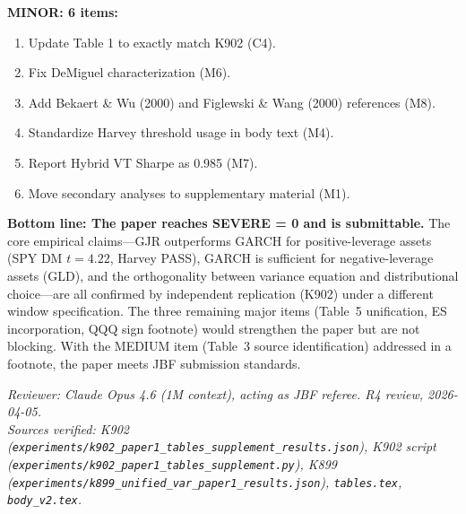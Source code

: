 \documentclass[12pt,a4paper]{article}
\begin{document}
\textbf{MINOR: 6 items:}
\begin{enumerate}[resume]
\item Update Table 1 to exactly match K902 (C4).
\item Fix DeMiguel characterization (M6).
\item Add Bekaert \& Wu (2000) and Figlewski \& Wang (2000) references (M8).
\item Standardize Harvey threshold usage in body text (M4).
\item Report Hybrid VT Sharpe as 0.985 (M7).
\item Move secondary analyses to supplementary material (M1).
\end{enumerate}

\bigskip

\noindent\textbf{Bottom line: The paper reaches SEVERE = 0 and is submittable.} The core empirical claims---GJR outperforms GARCH for positive-leverage assets (SPY DM $t = 4.22$, Harvey PASS), GARCH is sufficient for negative-leverage assets (GLD), and the orthogonality between variance equation and distributional choice---are all confirmed by independent replication (K902) under a different window specification. The three remaining major items (Table~5 unification, ES incorporation, QQQ sign footnote) would strengthen the paper but are not blocking. With the MEDIUM item (Table~3 source identification) addressed in a footnote, the paper meets JBF submission standards.

\bigskip

\noindent\textit{Reviewer: Claude Opus 4.6 (1M context), acting as JBF referee. R4 review, 2026-04-05.}\\
\noindent\textit{Sources verified: K902 (\texttt{experiments/k902\_paper1\_tables\_supplement\_results.json}), K902 script (\texttt{experiments/k902\_paper1\_tables\_supplement.py}), K899 (\texttt{experiments/k899\_unified\_var\_paper1\_results.json}), \texttt{tables.tex}, \texttt{body\_v2.tex}.}
\end{document}
